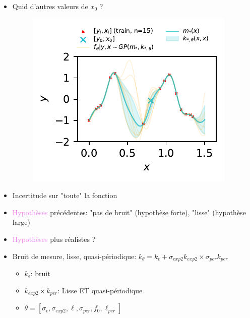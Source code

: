 \documentclass[xcolor=svgnames, t]{beamer}
\newcommand{\topurple}[1]{\textcolor{violet}{#1}}
\begin{document}
\begin{frame}{\subsecname}
  \begin{itemize}
    \item Quid d'autres valeurs de $x_0$ ?
      \begin{figure}
        \includegraphics{gp_1D_example_noisefree_pred_meanvar.pdf}
      \end{figure}
    \item Incertitude sur "toute" la fonction
  \end{itemize}
\end{frame}

\begin{frame}{\subsecname}
  \begin{itemize}
    \item \topurple{Hypothèses} précédentes: "pas de bruit" (hypothèse forte), "lisse" (hypothèse large)
    \pause
    \item \topurple{Hypothèses} plus réalistes ?
    \pause
    \item Bruit de mesure, lisse, quasi-périodique: $k_{\theta} = k_{\epsilon} + \sigma_{exp2} k_{exp2} \times \sigma_{per} k_{per}$
      \begin{itemize}
        \item $k_{\epsilon}$: bruit
        \item $k_{exp2} \times k_{per}$: Lisse ET quasi-périodique
        \item $\theta = [\sigma_{\epsilon}, \sigma_{exp2}, \ell, \sigma_{per}, f_0, \ell_{per}]$
      \end{itemize}
  \end{itemize}
\end{frame}
\end{document}
